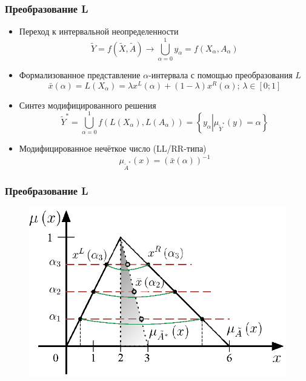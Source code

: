 \documentclass[12pt]{beamer}
\begin{document}

\begin{frame}
  \frametitle{Преобразование L}
  \begin{itemize}
    \item Переход к интервальной неопределенности
      \begin{equation}
        \label{eq:task-transform}
      	\tilde{Y} = f\left( \tilde X, \tilde A \right)\to \bigcup\limits_{\alpha =0}^{1}{y_\alpha}=f\left( X_\alpha, A_\alpha \right)
      \end{equation}
    \item Формализованное представление $\alpha$-интервала с помощью преобразования $L$
      \begin{equation}
        \label{eq:L-transform-base}
        \bar{x}\left( \alpha  \right)=L\left( X_\alpha \right)=\lambda x^L \left( \alpha  \right)+\left( 1-\lambda  \right) x^R \left( \alpha  \right);\, \lambda \in \left[0; 1 \right]
      \end{equation}
    \item Синтез модифицированного решения
      \begin{equation}
        \tilde Y^{*}= \bigcup\limits_{\alpha =0}^{1} f\left(L\left( X_\alpha \right), L\left( A_\alpha \right) \right)=\left\{ y_\alpha \left| \mu_{\tilde Y^*}(y)=\alpha \right. \right\}
      \end{equation}
    \item Модифицированное нечёткое число (LL/RR-типа)
      \begin{equation}
        \label{eq:modified-number}
        \mu_{\tilde A^{*}}\left( x \right)={\left( \bar{x}\left( \alpha  \right) \right)}^{-1}
      \end{equation}
  \end{itemize}
\end{frame}


\begin{frame}
  \frametitle{Преобразование L}
  \begin{figure}
    \center
    \includegraphics[width=\textwidth]{l-transform-full}
  \end{figure}
\end{frame}
\end{document}
